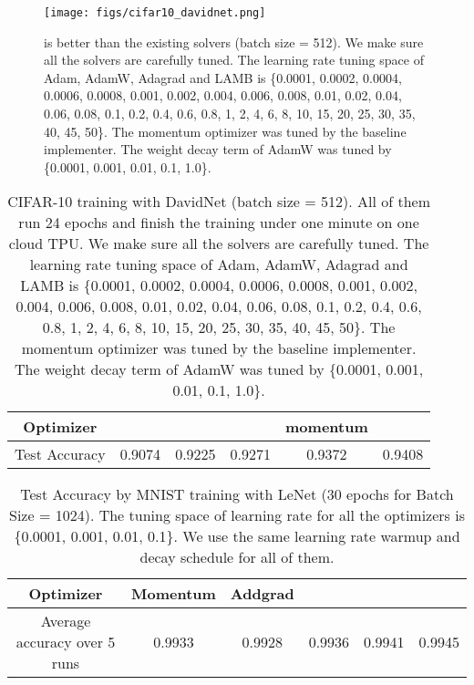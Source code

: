 \documentclass{article} \usepackage{iclr2020_conference,times}
\begin{document}
\begin{figure*}[tb]
\vspace{5pt}
\centering
\texttt{[image: figs/cifar10\_davidnet.png]}
\caption{ is better than the existing solvers (batch size = 512). We make sure all the solvers are carefully tuned. The learning rate tuning space of Adam, AdamW, Adagrad and LAMB is \{0.0001, 0.0002, 0.0004, 0.0006, 0.0008, 0.001, 0.002, 0.004, 0.006, 0.008, 0.01, 0.02, 0.04, 0.06, 0.08, 0.1, 0.2, 0.4, 0.6, 0.8, 1, 2, 4, 6, 8, 10, 15, 20, 25, 30, 35, 40, 45, 50\}. The momentum optimizer was tuned by the baseline implementer. The weight decay term of AdamW was tuned by \{0.0001, 0.001, 0.01, 0.1, 1.0\}.}
\label{fig:cifar10_davidnet}
\vspace{-10pt}
\end{figure*}


\begin{table}[ht]
\renewcommand{\arraystretch}{1.3}
\caption{ CIFAR-10 training with DavidNet (batch size = 512). All of them run 24 epochs and finish the training under one minute on one cloud TPU. We make sure all the solvers are carefully tuned. The learning rate tuning space of Adam, AdamW, Adagrad and LAMB is \{0.0001, 0.0002, 0.0004, 0.0006, 0.0008, 0.001, 0.002, 0.004, 0.006, 0.008, 0.01, 0.02, 0.04, 0.06, 0.08, 0.1, 0.2, 0.4, 0.6, 0.8, 1, 2, 4, 6, 8, 10, 15, 20, 25, 30, 35, 40, 45, 50\}. The momentum optimizer was tuned by the baseline implementer. The weight decay term of AdamW was tuned by \{0.0001, 0.001, 0.01, 0.1, 1.0\}.}
\centering
\begin{tabular}{|c|c|c|c|c|c|}
\hline
Optimizer &  &  &  & momentum &  \\
\hline
\hline
Test Accuracy & 0.9074 & 0.9225 & 0.9271 & 0.9372 & 0.9408 \\
\hline
\end{tabular}
\label{table:cifar10_davidnet}
\end{table}




\begin{table}[ht]
\renewcommand{\arraystretch}{1.3}
\caption{ Test Accuracy by MNIST training with LeNet (30 epochs for Batch Size = 1024). The tuning space of learning rate for all the optimizers is \{0.0001, 0.001, 0.01, 0.1\}. We use the same learning rate warmup and decay schedule for all of them.}
\centering
\begin{tabular}{|c|c|c|c|c|c|}
\hline
Optimizer & Momentum & Addgrad &  &  &  \\
\hline
\hline
Average accuracy over 5 runs & 0.9933  & 0.9928 & 0.9936 & 0.9941 & 0.9945  \\
\hline
\end{tabular}
\label{table:mnist_results}
\end{table}
\end{document}
